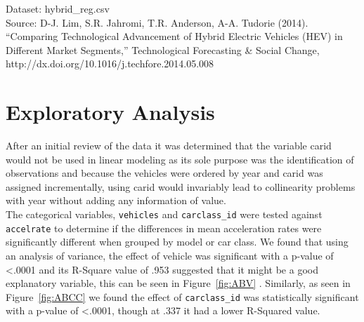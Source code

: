 \documentclass[acmsmall]{acmart}
\begin{document}
\noindent Dataset: hybrid\_reg.csv\\
Source: D-J. Lim, S.R. Jahromi, T.R. Anderson, A-A. Tudorie (2014). “Comparing Technological Advancement of Hybrid Electric Vehicles (HEV) in Different Market Segments,” Technological Forecasting \& Social Change, http://dx.doi.org/10.1016/j.techfore.2014.05.008

\section{Exploratory Analysis}
After an initial review of the data it was determined that the variable carid would not be used in linear modeling as its sole purpose was the identification of observations and because the vehicles were ordered by year and carid was assigned incrementally, using carid would invariably lead to collinearity problems with year without adding any information of value. \\

The categorical variables, \texttt{vehicles} and \texttt{carclass\_id} were tested against \texttt{accelrate} to determine if the differences in mean acceleration rates were significantly different when grouped by model or car class. We found that using an analysis of variance, the effect of vehicle was significant with a p-value of <.0001 and its R-Square value of .953 suggested that it might be a good explanatory variable, this can be seen in Figure~\ref{fig:ABV} . Similarly, as seen in Figure~\ref{fig:ABCC} we found the effect of \texttt{carclass\_id} was statistically significant with a p-value of <.0001, though at .337 it had a lower R-Squared value. \\
\end{document}
